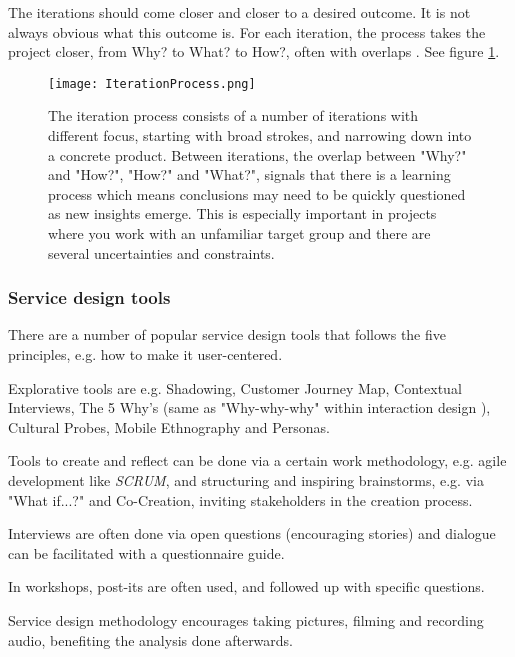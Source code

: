 The iterations should come closer and closer to a desired outcome. It is not always obvious what this outcome is. For each iteration, the process takes the project closer, from Why? to What? to How?, often with overlaps \citep{expedition-mondial}. See figure \ref{fig:iterationprocess}.


\begin{figure}[h]
    \centering
    \texttt{[image: IterationProcess.png]}
    \caption{The iteration process consists of a number of iterations with different focus, starting with broad strokes, and narrowing down into a concrete product. Between iterations, the overlap between "Why?" and "How?", "How?" and "What?", signals that there is a learning process which means conclusions may need to be quickly questioned as new insights emerge. This is especially important in projects where you work with an unfamiliar target group and there are several uncertainties and constraints.}
    \label{fig:iterationprocess}
\end{figure}

\subsubsection{Service design tools}

There are a number of popular service design tools that follows the five principles, e.g. how to make it user-centered.

Explorative tools are e.g. Shadowing, Customer Journey Map, Contextual Interviews, The 5 Why's (same as "Why-why-why" within interaction design \citep{lowgren}), Cultural Probes, Mobile Ethnography and Personas.

Tools to create and reflect can be done via a certain work methodology, e.g. agile development like \textit{SCRUM}, and structuring and inspiring brainstorms, e.g. via "What if...?" and Co-Creation, inviting stakeholders in the creation process.

Interviews are often done via open questions (encouraging stories) and dialogue can be facilitated with a questionnaire guide.

In workshops, post-its are often used, and followed up with specific questions.

Service design methodology encourages taking pictures, filming and recording audio, benefiting the analysis done afterwards.

%


%

%
